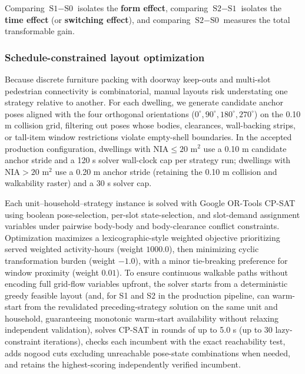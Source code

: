 \documentclass[12pt,letterpaper]{article}
\newcommand{\SubmissionCite}[1]{\unskip\citep{#1}}
\begin{document}
Comparing \(\text{S1} - \text{S0}\) isolates the \textbf{form effect}, comparing \(\text{S2} - \text{S1}\) isolates the \textbf{time effect} (or \textbf{switching effect}), and comparing \(\text{S2} - \text{S0}\) measures the total transformable gain.

\subsubsection{Schedule-constrained layout optimization}\label{schedule-constrained-layout-optimization}

Because discrete furniture packing with doorway keep-outs and multi-slot pedestrian connectivity is combinatorial, manual layouts risk understating one strategy relative to another. For each dwelling, we generate candidate anchor poses aligned with the four orthogonal orientations (\(0^\circ, 90^\circ, 180^\circ, 270^\circ\)) on the 0.10 m collision grid, filtering out poses whose bodies, clearances, wall-backing strips, or tall-item window restrictions violate empty-shell boundaries. In the accepted production configuration, dwellings with \(\text{NIA} \le 20\text{ m}^2\) use a 0.10 m candidate anchor stride and a 120 s solver wall-clock cap per strategy run; dwellings with \(\text{NIA} > 20\text{ m}^2\) use a 0.20 m anchor stride (retaining the 0.10 m collision and walkability raster) and a 30 s solver cap.

Each unit--household--strategy instance is solved with Google OR-Tools CP-SAT \SubmissionCite{perron2023cpsat} using boolean pose-selection, per-slot state-selection, and slot-demand assignment variables under pairwise body-body and body-clearance conflict constraints. Optimization maximizes a lexicographic-style weighted objective prioritizing served weighted activity-hours (weight \(1000.0\)), then minimizing cyclic transformation burden (weight \(-1.0\)), with a minor tie-breaking preference for window proximity (weight \(0.01\)). To ensure continuous walkable paths without encoding full grid-flow variables upfront, the solver starts from a deterministic greedy feasible layout (and, for S1 and S2 in the production pipeline, can warm-start from the revalidated preceding-strategy solution on the same unit and household, guaranteeing monotonic warm-start availability without relaxing independent validation), solves CP-SAT in rounds of up to 5.0 s (up to 30 lazy-constraint iterations), checks each incumbent with the exact reachability test, adds nogood cuts excluding unreachable pose-state combinations when needed, and retains the highest-scoring independently verified incumbent.
\end{document}
